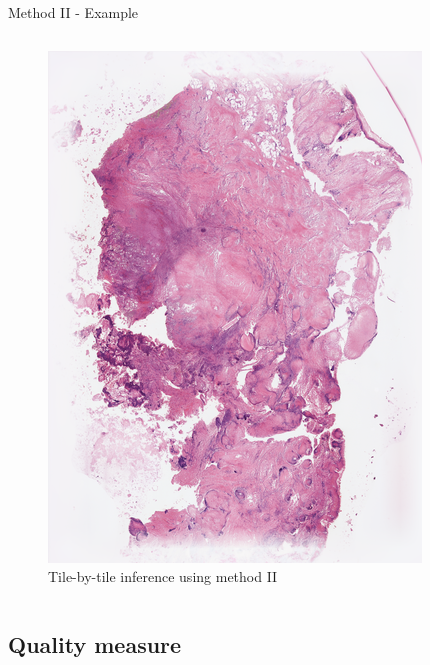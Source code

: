 \documentclass[t]{beamer}
\begin{document}
\begin{frame}{Method II - Example}
\begin{columns}
\begin{column}{0.5\textwidth}
\begin{figure}
\centering
\includegraphics[width=0.75\linewidth]{scan6-pyramid}
\caption{Tile-by-tile inference using method II}
\end{figure}
\end{column}

\end{columns}

\end{frame}

\subsection{Quality measure}
\end{document}
